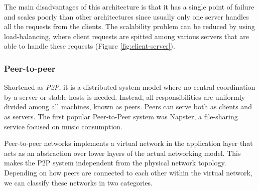 The main disadvantages of this architecture is that it has a single point of failure and scales poorly than other architectures since usually only one server handles all the requests from the clients. The scalability problem can be reduced by using load-balancing, where client requests are spitted among various servers that are able to handle these requests (Figure \ref{fig:client-server}).

\subsubsection*{Peer-to-peer}
Shortened as \textit{P2P}, it is a distributed system model where no central coordination by a server or stable hosts is needed. Instead, all responsibilities are uniformly divided among all machines, known as peers. Peers can serve both as clients and as servers\cite{p2p-principles}.
The first popular Peer-to-Peer system was Napster, a file-sharing service focused on music consumption.

Peer-to-peer networks implements a virtual network in the application layer that acts as an abstraction over lower layers of the actual networking model. This makes the P2P system independent from the physical network topology. Depending on how peers are connected to each other within the virtual network, we can classify these networks in two categories.

